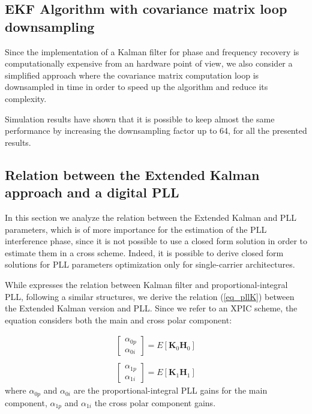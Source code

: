 \subsection{EKF Algorithm with covariance matrix loop downsampling}
\label{SecDSF}
Since the implementation of a Kalman filter for phase and frequency recovery is computationally expensive from an hardware point of view, we also consider a simplified approach where the covariance matrix computation loop is downsampled in time in order to speed up the algorithm and reduce its complexity. 

Simulation results have shown that it is possible to keep almost the same performance by increasing the downsampling factor up to 64, for all the presented results.

\subsection{Relation between the Extended Kalman approach and a digital PLL}
\label{KalmRelationPLL}

In this section we analyze the relation between the Extended Kalman and PLL parameters, which is of more importance for the estimation of the PLL interference phase, since it is not possible to use a closed form solution in order to estimate them in a cross scheme. Indeed, it is possible to derive closed form solutions for PLL parameters optimization only for single-carrier architectures.



While \cite{Patapoutian} expresses the relation between Kalman filter and proportional-integral PLL, following a similar structures, we derive the relation (\ref{eq_pllK}) between the Extended Kalman version and PLL.
Since we refer to an XPIC scheme, the equation considers both the main and cross polar component:

\begin{equation}
\begin{array}{c}
\left[ \begin{array}{c} \alpha_{0p}\\\alpha_{0i}\end{array}\right] 	 =E[\mathbf{K}_0\mathbf{H}_0]\\
\\
\left[ \begin{array}{c} \alpha_{1p}\\\alpha_{1i}\end{array}\right] 	 =E[\mathbf{K}_1 \mathbf{H}_1]
\end{array}	
\label{eq_pllK}
\end{equation}
where $\alpha_{0p}$ and $\alpha_{0i}$ are the proportional-integral PLL gains for the main component,  $\alpha_{1p}$ and $\alpha_{1i}$ the cross polar component gains.
 
